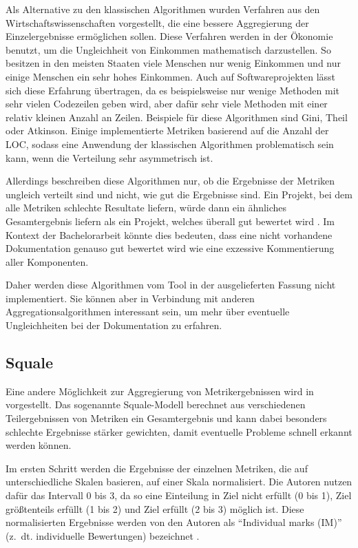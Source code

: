  Als Alternative zu den klassischen Algorithmen wurden Verfahren aus den Wirtschaftswissenschaften vorgestellt, die eine bessere Aggregierung der Einzelergebnisse ermöglichen sollen. Diese Verfahren werden in der Ökonomie benutzt, um die Ungleichheit von Einkommen mathematisch darzustellen. So besitzen in den meisten Staaten viele Menschen nur wenig Einkommen und nur einige Menschen ein sehr hohes Einkommen. Auch auf Softwareprojekten lässt sich diese Erfahrung übertragen, da es beispielsweise nur wenige Methoden mit sehr vielen Codezeilen geben wird, aber dafür sehr viele Methoden mit einer relativ kleinen Anzahl an Zeilen. Beispiele für diese Algorithmen sind Gini, Theil oder Atkinson. Einige implementierte Metriken  basierend auf die Anzahl der \ac{LOC}, sodass eine Anwendung der klassischen Algorithmen problematisch sein kann, wenn die Verteilung sehr asymmetrisch ist. \cite[S.~314]{Youcantcontroltheunfamiliar:Astudyontherelationsbetweenaggregationtechniquesforsoftwaremetrics} 
 
 Allerdings beschreiben diese Algorithmen nur, ob die Ergebnisse der Metriken ungleich verteilt sind und nicht, wie gut die Ergebnisse sind. Ein Projekt, bei dem alle Metriken schlechte Resultate liefern, würde dann ein ähnliches Gesamtergebnis liefern als ein Projekt, welches überall gut bewertet wird \cite[S.~1121]{Softwarequalitymetricsaggregationinindustry}.  Im Kontext der Bachelorarbeit könnte dies bedeuten, dass eine nicht vorhandene Dokumentation genauso gut bewertet wird wie eine exzessive Kommentierung aller Komponenten. 
 
 Daher werden diese Algorithmen vom Tool in der ausgelieferten Fassung nicht implementiert. Sie können aber in Verbindung mit anderen Aggregationsalgorithmen interessant sein, um mehr über eventuelle Ungleichheiten bei der Dokumentation zu erfahren.
 
 \subsection{Squale}\label{chapter:squale}
 Eine andere Möglichkeit zur Aggregierung von Metrikergebnissen wird in \cite[S.~1124ff.]{Softwarequalitymetricsaggregationinindustry} vorgestellt. Das sogenannte Squale-Modell berechnet aus verschiedenen Teilergebnissen von Metriken ein Gesamtergebnis und kann dabei besonders schlechte Ergebnisse stärker gewichten, damit eventuelle Probleme schnell erkannt werden können. 
 
 Im ersten Schritt werden die Ergebnisse der einzelnen Metriken, die auf unterschiedliche Skalen basieren, auf einer Skala normalisiert. Die Autoren nutzen dafür das Intervall 0 bis 3, da so eine Einteilung in Ziel nicht erfüllt (0 bis 1), Ziel größtenteils erfüllt (1 bis 2) und Ziel erfüllt (2 bis 3) möglich ist. Diese normalisierten Ergebnisse werden von den Autoren als \enquote{Individual marks (IM)} (z.~dt. individuelle Bewertungen) bezeichnet \cite[S.~142]{AnEmpiricalModelforContinuousandWeightedMetricAggregation}. 
 
